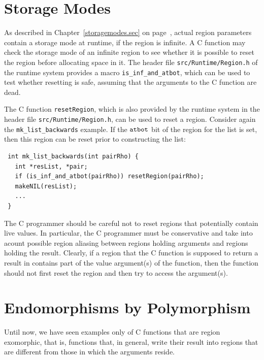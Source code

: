 \documentclass[12pt]{book}
\begin{document}
\section{Storage Modes}
As described in Chapter~\ref{storagemodes.sec} on
page~\pageref{atbit.lab}, actual region parameters contain a storage
mode at runtime, if the region is infinite.  A C function may check
the storage mode of an infinite region to see whether it is possible
to reset the region before allocating space in it. The header file
{\tt src/Runtime/Region.h} of the runtime system provides a macro
%
\verb|is_inf_and_atbot|, which can be used to test whether resetting
is safe, assuming that the arguments to the C function are dead.

The C function \texttt{resetRegion}, which is also provided by the
runtime system in the header file {\tt src/Runtime/Region.h}, can be
used to reset a region. Consider again the \verb|mk_list_backwards|
example. If the $\hbox{\tt atbot}$ bit of the region for the list is set, then
this region can be reset prior to constructing the list:
%
\begin{verbatim}
 int mk_list_backwards(int pairRho) {
   int *resList, *pair;
   if (is_inf_and_atbot(pairRho)) resetRegion(pairRho);
   makeNIL(resList);  
   ...
 }
\end{verbatim}
The C programmer should be careful not to reset regions that
potentially contain live values. In particular, the C programmer must be
conservative and take into acount possible region aliasing between
regions holding arguments and regions holding the result. 
Clearly, if a region that the C function is supposed to
return a result in contains part of the value argument(s) of the function,
then the function should not first reset the region and 
then try to access the argument(s).

\section{Endomorphisms by Polymorphism}
\label{C_polymorphism.sec}
Until now, we have seen examples only of C functions that are region
exomorphic, that is, functions that, in general, write their result
into regions that are different from those in which the arguments
reside.
\end{document}
